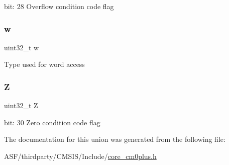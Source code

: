 bit\+: 28 Overflow condition code flag \mbox{\label{unionx_p_s_r___type_ad0fb62e7a08e70fc5e0a76b67809f84b}} 
\subsubsection{\texorpdfstring{w}{w}}
{\footnotesize\ttfamily uint32\+\_\+t w}

Type used for word access \mbox{\label{unionx_p_s_r___type_a5ae954cbd9986cd64625d7fa00943c8e}} 
\subsubsection{\texorpdfstring{Z}{Z}}
{\footnotesize\ttfamily uint32\+\_\+t Z}

bit\+: 30 Zero condition code flag 

The documentation for this union was generated from the following file\+:\begin{DoxyCompactItemize}
\item 
A\+S\+F/thirdparty/\+C\+M\+S\+I\+S/\+Include/\mbox{\hyperlink{core__cm0plus_8h}{core\+\_\+cm0plus.\+h}}\end{DoxyCompactItemize}
